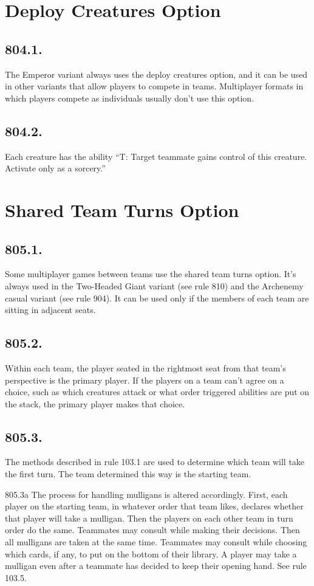 \section{Deploy Creatures Option}
\subsection*{804.1.}
The Emperor variant always uses the deploy creatures option, and it can be used in other variants that allow players to compete in teams. Multiplayer formats in which players compete as individuals usually don’t use this option.

\subsection*{804.2.}
Each creature has the ability “{T}: Target teammate gains control of this creature. Activate only as a sorcery.”

\section{Shared Team Turns Option}
\subsection*{805.1.}
Some multiplayer games between teams use the shared team turns option. It’s always used in the Two-Headed Giant variant (see rule 810) and the Archenemy casual variant (see rule 904). It can be used only if the members of each team are sitting in adjacent seats.

\subsection*{805.2.}
Within each team, the player seated in the rightmost seat from that team’s perspective is the primary player. If the players on a team can’t agree on a choice, such as which creatures attack or what order triggered abilities are put on the stack, the primary player makes that choice.

\subsection*{805.3.}
The methods described in rule 103.1 are used to determine which team will take the first turn. The team determined this way is the starting team.

805.3a The process for handling mulligans is altered accordingly. First, each player on the starting team, in whatever order that team likes, declares whether that player will take a mulligan. Then the players on each other team in turn order do the same. Teammates may consult while making their decisions. Then all mulligans are taken at the same time. Teammates may consult while choosing which cards, if any, to put on the bottom of their library. A player may take a mulligan even after a teammate has decided to keep their opening hand. See rule 103.5.

